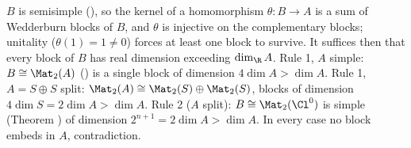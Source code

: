 $B$ is semisimple (), so the kernel of a homomorphism $\theta : B \to A$ is a sum of Wedderburn blocks of $B$, and $\theta$ is injective on the complementary blocks; unitality ($\theta(1) = 1 \neq 0$) forces at least one block to survive. It suffices then that every block of $B$ has real dimension exceeding $\dim_\R A$. Rule 1, $A$ simple: $B \cong \Mat_2(A)$ () is a single block of dimension $4 \dim A > \dim A$. Rule 1, $A = S \oplus S$ split: $\Mat_2(A) \cong \Mat_2(S) \oplus \Mat_2(S)$, blocks of dimension $4 \dim S = 2 \dim A > \dim A$. Rule 2 ($A$ split): $B \cong \Mat_2(\Cl^0)$ is simple (Theorem ) of dimension $2^{n+1} = 2\dim A > \dim A$. In every case no block embeds in $A$, contradiction.
